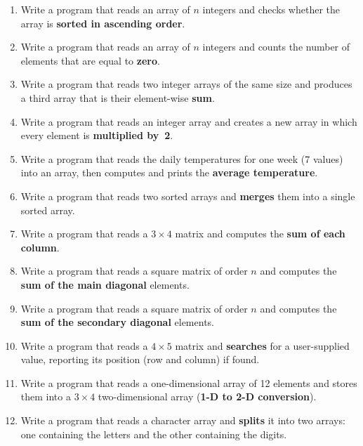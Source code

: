 \begin{enumerate}[leftmargin=*, label=\textbf{Q\arabic*.}]

\item Write a program that reads an array of $n$ integers and checks
      whether the array is \textbf{sorted in ascending order}.

\item Write a program that reads an array of $n$ integers and counts
      the number of elements that are equal to \textbf{zero}.

\item Write a program that reads two integer arrays of the same size
      and produces a third array that is their element-wise
      \textbf{sum}.

\item Write a program that reads an integer array and creates a new
      array in which every element is \textbf{multiplied by~2}.

\item Write a program that reads the daily temperatures for one week
      (7 values) into an array, then computes and prints the
      \textbf{average temperature}.

\item Write a program that reads two sorted arrays and \textbf{merges}
      them into a single sorted array.

\item Write a program that reads a $3 \times 4$ matrix and computes
      the \textbf{sum of each column}.

\item Write a program that reads a square matrix of order $n$ and
      computes the \textbf{sum of the main diagonal} elements.

\item Write a program that reads a square matrix of order $n$ and
      computes the \textbf{sum of the secondary diagonal} elements.

\item Write a program that reads a $4 \times 5$ matrix and
      \textbf{searches} for a user-supplied value, reporting its
      position (row and column) if found.

\item Write a program that reads a one-dimensional array of 12 elements
      and stores them into a $3 \times 4$ two-dimensional array
      (\textbf{1-D to 2-D conversion}).

\item Write a program that reads a character array and \textbf{splits}
      it into two arrays: one containing the letters and the other
      containing the digits.


\end{enumerate}

